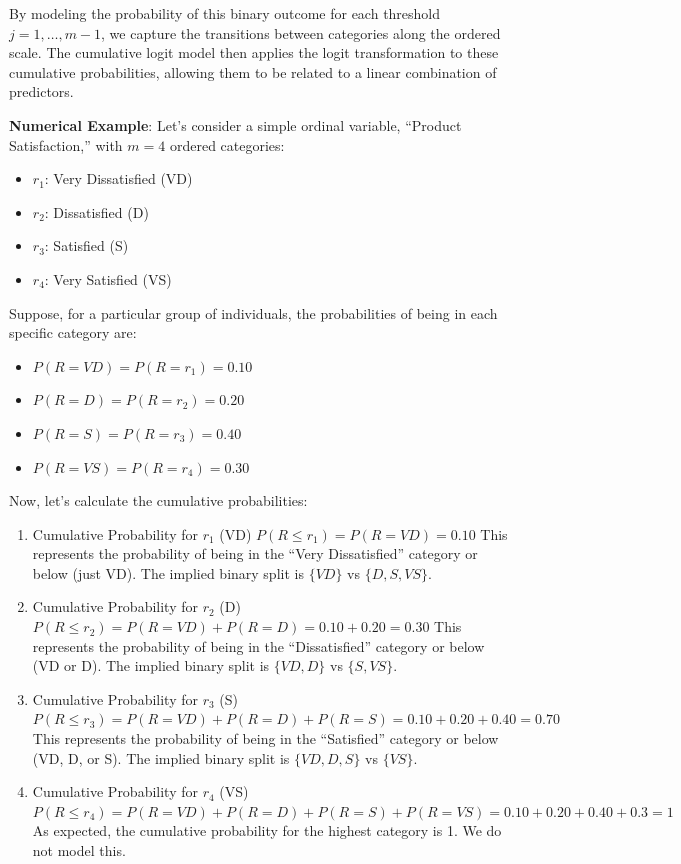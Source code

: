 \documentclass[
  letterpaper,
  DIV=11,
  numbers=noendperiod]{scrartcl}
\providecommand{\tightlist}{%
  \setlength{\itemsep}{0pt}\setlength{\parskip}{0pt}}\usepackage{longtable,booktabs,array}
\begin{document}
By modeling the probability of this binary outcome for each threshold
\(j=1,\dots,m−1\), we capture the transitions between categories along
the ordered scale. The cumulative logit model then applies the logit
transformation to these cumulative probabilities, allowing them to be
related to a linear combination of predictors.

\textbf{Numerical Example}: Let's consider a simple ordinal variable,
``Product Satisfaction,'' with \(m = 4\) ordered categories:

\begin{itemize}
\tightlist
\item
  \(r_1\): Very Dissatisfied (VD)
\item
  \(r_2\): Dissatisfied (D)
\item
  \(r_3\): Satisfied (S)
\item
  \(r_4\): Very Satisfied (VS)
\end{itemize}

Suppose, for a particular group of individuals, the probabilities of
being in each specific category are:

\begin{itemize}
\tightlist
\item
  \(P(R=VD)=P(R=r_1)=0.10\)
\item
  \(P(R=D)=P(R=r_2)=0.20\)
\item
  \(P(R=S)=P(R=r_3)=0.40\)
\item
  \(P(R=VS)=P(R=r_4)=0.30\)
\end{itemize}

Now, let's calculate the cumulative probabilities:

\begin{enumerate}
\def\labelenumi{\arabic{enumi}.}
\item
  Cumulative Probability for \(r_1\) (VD)
  \(P(R \leq r_1) = P(R = VD) = 0.10\) This represents the probability
  of being in the ``Very Dissatisfied'' category or below (just VD). The
  implied binary split is \(\{VD\}\) vs \(\{D, S, VS\}\).
\item
  Cumulative Probability for \(r_2\) (D)
  \(P(R \leq r_2) = P(R = VD) + P(R = D) = 0.10 + 0.20 = 0.30\) This
  represents the probability of being in the ``Dissatisfied'' category
  or below (VD or D). The implied binary split is \(\{VD, D\}\) vs
  \(\{S, VS\}\).
\item
  Cumulative Probability for \(r_3\) (S)
  \(P(R \leq r_3) = P(R = VD) + P(R = D) + P(R = S) = 0.10 + 0.20 + 0.40 = 0.70\)
  This represents the probability of being in the ``Satisfied'' category
  or below (VD, D, or S). The implied binary split is \(\{VD, D, S\}\)
  vs \(\{VS\}\).
\item
  Cumulative Probability for \(r_4\) (VS)
  \(P(R \leq r_4) = P(R = VD) + P(R = D) + P(R = S) + P(R = VS) = 0.10 + 0.20 + 0.40 + 0.3 = 1\)
  As expected, the cumulative probability for the highest category is 1.
  We do not model this.
\end{enumerate}
\end{document}
